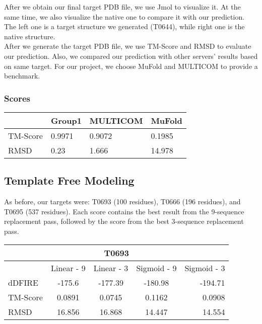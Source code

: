 \documentclass{article}
\begin{document}
After we obtain our final target PDB file, we use Jmol to visualize it. At the same time, we also visualize the native one to compare it with our prediction. The left one is a target structure we generated (T0644), while right one is the native structure.\\

After we generate the target PDB file, we use TM-Score and RMSD to evaluate our prediction. Also, we compared our prediction with other servers' results based on same target. For our project, we choose MuFold and MULTICOM to provide a benchmark.


\begin{center}
	\subsubsection*{Scores}
    \begin{tabular}{ | l | l | l | p{2cm} |}
    \hline
      & Group1 & MULTICOM & MuFold \\ \hline
    TM-Score & 0.9971 & 0.9072 & 0.1985 \\ \hline
    RMSD & 0.23 & 1.666 & 14.978 \\
    \hline
    \end{tabular}
\end{center}


\subsection{Template Free Modeling}

As before, our targets were: T0693 (100 residues), T0666 (196 residues), and T0695 (537 residues).  Each score contains the best result from the 9-sequence replacement pass, followed by the score from the best 3-sequence replacement pass.

\begin{center}
\begin{tabular}{|l|c|c|c|r|}
\multicolumn{5}{c}{T0693} \\
    \hline
      & Linear - 9 & Linear - 3 & Sigmoid - 9 & Sigmoid - 3\\ \hline
    dDFIRE & -175.6 & -177.39 & -180.98 & -194.71 \\ \hline
    TM-Score & 0.0891 & 0.0745 & 0.1162 & 0.0908 \\ \hline
    RMSD & 16.856 & 16.868 & 14.447 & 14.554 \\
    \hline
    \end{tabular}
\end{center}
\end{document}

